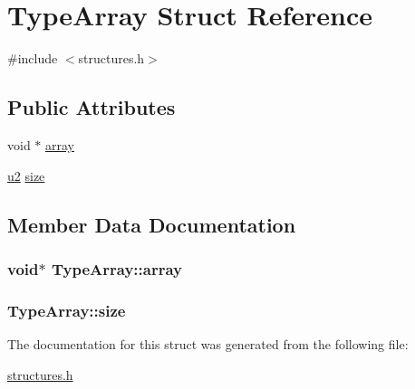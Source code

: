 \hypertarget{structTypeArray}{}\section{Type\+Array Struct Reference}
\label{structTypeArray}


{\ttfamily \#include $<$structures.\+h$>$}

\subsection*{Public Attributes}
\begin{DoxyCompactItemize}
\item 
void $\ast$ \hyperlink{structTypeArray_a6126c1f56950b1821af98aa19d4c5cdc}{array}
\item 
\hyperlink{structures_8h_a55ef8d87fd202b8417704c089899c5b9}{u2} \hyperlink{structTypeArray_a51c37b7d51078be5f6f6dc83c58fdb22}{size}
\end{DoxyCompactItemize}


\subsection{Member Data Documentation}
\subsubsection[{\texorpdfstring{array}{array}}]{\setlength{\rightskip}{0pt plus 5cm}void$\ast$ Type\+Array\+::array}\hypertarget{structTypeArray_a6126c1f56950b1821af98aa19d4c5cdc}{}\label{structTypeArray_a6126c1f56950b1821af98aa19d4c5cdc}
\subsubsection[{\texorpdfstring{size}{size}}]{ Type\+Array\+::size}\hypertarget{structTypeArray_a51c37b7d51078be5f6f6dc83c58fdb22}{}\label{structTypeArray_a51c37b7d51078be5f6f6dc83c58fdb22}


The documentation for this struct was generated from the following file\+:\begin{DoxyCompactItemize}
\item 
\hyperlink{structures_8h}{structures.\+h}\end{DoxyCompactItemize}
